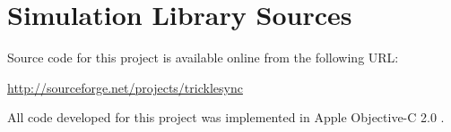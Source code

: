 \chapter{Simulation Library Sources}\label{librarysources}

Source code for this project is available online from the following URL:

\begin{center}
\url{http://sourceforge.net/projects/tricklesync}
\end{center}

All code developed for this project was implemented in Apple Objective-C 2.0 \cite{RefWorks:35}.